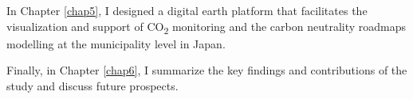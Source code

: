In Chapter \ref{chap5}, I designed a digital earth platform that facilitates the visualization and support of CO\textsubscript{2} monitoring and the carbon neutrality roadmaps modelling at the municipality level in Japan. \par

Finally, in Chapter \ref{chap6}, I summarize the key findings and contributions of the study and discuss future prospects.\par